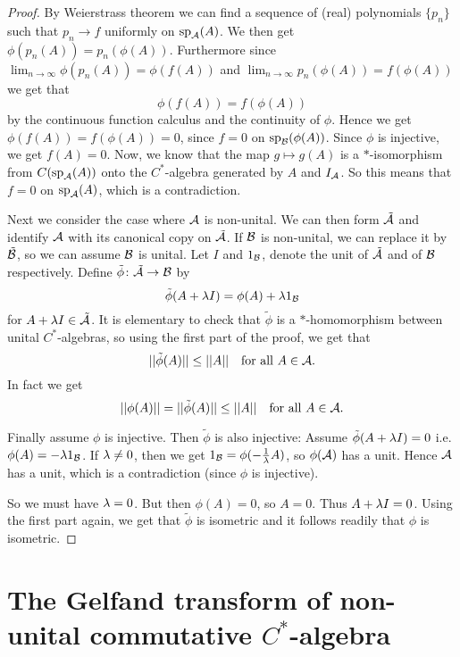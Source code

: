 \documentclass[10pt,english,a4paper]{article}
\theoremstyle{definition}
\DeclareMathOperator{\Sp}{sp}
\begin{document}
\begin{proof}
By Weierstrass theorem we can find a sequence of (real) polynomials $\{p_n\}$
such that $p_n \to f$ uniformly on $\Sp_{\As}(A)$. We then get $\phi(p_n(A)) = p_n(\phi(A))$. Furthermore 
since $\lim_{n\to\infty} \phi(p_n(A)) = \phi(f(A))$ and $\lim_{n \to \infty}
p_n(\phi(A)) = f(\phi(A))$ we get that \[\phi(f(A)) = f(\phi(A))\] by the
continuous function calculus and the continuity of $\phi$.
Hence we get $\phi(f(A)) = f(\phi(A)) = 0$, since $f = 0$ on $\Sp_{\Bs}(\phi(A))$. 
Since $\phi$ is injective, we get $f(A) = 0$. Now, we know that the map $g \mapsto g(A)$
is a $*$-isomorphism from $C(\Sp_{\As}(A))$ onto the $C^*$-algebra generated 
by $A$ and $I_{\mathcal{A}}$. So this means that $f=0$ on $\Sp_{\As}(A)$, which is a contradiction. 

Next we consider the case where $\mathcal{A}$ is non-unital. 
We can then form $\tilde{\mathcal{A}}$ and identify $\mathcal{A}$ with its canonical copy on $\tilde{\mathcal{A}}$.
If $\mathcal{B}$ is non-unital, we can replace it by $\tilde{\mathcal{B}}$, so we can assume $\mathcal{B}$ is 
unital. Let $I$ and $1_{\mathcal{B}}$, denote the unit of $\tilde{\mathcal{A}}$ and of $\mathcal{B}$ 
respectively. Define $\tilde{\phi}\colon \tilde{\mathcal{A}} \to \mathcal{B}$ by 
\[ \tilde{\phi}(A + \lambda I) = \phi(A) + \lambda 1_{\mathcal{B}} \]
for $A + \lambda I \in \tilde{\mathcal{A}}$. It is elementary to check that 
$\tilde{\phi}$ is a $*$-homomorphism between unital $C^*$-algebras, so using 
the first part of the proof, we get that 
\[ ||\tilde{\phi}(A) || \leq ||A|| \quad \text{for all } A \in \mathcal{A}.\]
In fact we get 
\[ ||\phi(A)|| = ||\tilde{\phi}(A)|| \leq||A|| \quad \text{for all }A \in \mathcal{A}. \]

Finally assume $\phi$ is injective. Then $\tilde{\phi}$ is also injective:
Assume $\tilde{\phi}(A + \lambda I) = 0$ i.e. $\phi(A) = - \lambda 1_{\mathcal{B}}$.
If $\lambda \neq 0$, then we get $1_{\mathcal{B}} = \phi(-\tfrac{1}{\lambda}A)$, so $\phi(\mathcal{A})$
has a unit. Hence $\mathcal{A}$ has a unit, which is a contradiction (since $\phi$ is injective).

So we must have $\lambda =0$. But then $\phi(A) = 0$, so $A = 0$. Thus $A+ \lambda I = 0$. 
Using the first part again, we get that $\tilde{\phi}$ is isometric and it follows readily 
that $\phi$ is isometric. 


\end{proof}

\section{The Gelfand transform of non-unital commutative $C^*$-algebra}
\end{document}
